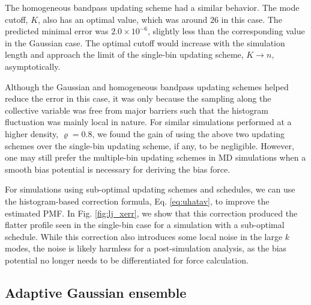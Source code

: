 \documentclass[reprint, superscriptaddress, floatfix]{revtex4-1}
\begin{document}
The homogeneous bandpass updating scheme
had a similar behavior.
%
The mode cutoff, $K$, also has an optimal value,
which was around $26$ in this case.
%
The predicted minimal error was $2.0\times 10^{-6}$,
  slightly less than the corresponding value
  in the Gaussian case.
%
The optimal cutoff would increase with the simulation length
and approach the limit of the single-bin updating scheme, $K \to n$,
asymptotically.


Although the Gaussian and homogeneous bandpass updating schemes
helped reduce the error in this case,
it was only because
the sampling along the collective variable
was free from major barriers
such that the histogram fluctuation was mainly local in nature.
%
For similar simulations performed at a higher density, $\varrho = 0.8$,
we found the gain of using the above two updating schemes
over the single-bin updating scheme, if any, to be negligible.
%
However, one may still prefer the multiple-bin updating schemes
in MD simulations
when a smooth bias potential is necessary
for deriving the bias force.

For simulations using sub-optimal
updating schemes and schedules,
we can use the histogram-based correction formula,
Eq. \eqref{eq:uhatav},
to improve the estimated PMF.
%
In Fig. \ref{fig:lj_xerr},
we show that this correction produced
the flatter profile seen in the single-bin case
for a simulation with a sub-optimal schedule.
%
While this correction also introduces
some local noise in the large $k$ modes,
the noise is likely harmless
for a post-simulation analysis, as
the bias potential no longer needs to be differentiated
for force calculation.
%





\subsection{\label{sec:potts}
Adaptive Gaussian ensemble}
\end{document}
